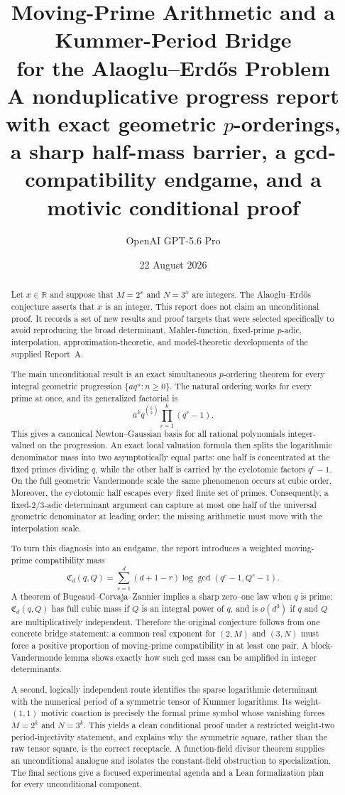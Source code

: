 \documentclass[11pt]{article}
\title{\textbf{Moving-Prime Arithmetic and a Kummer-Period Bridge\\
for the Alaoglu--Erd\H{o}s Problem}\\[0.7em]
\large A nonduplicative progress report with exact geometric $p$-orderings,\\
a sharp half-mass barrier, a gcd-compatibility endgame, and a motivic conditional proof}
\author{OpenAI GPT-5.6 Pro}
\date{22 August 2026}
\theoremstyle{definition}
\theoremstyle{remark}
\newcommand{\R}{\mathbb R}
\newcommand{\AEname}{Alaoglu--Erd\H{o}s}
\begin{document}
\maketitle

\begin{abstract}
Let $x\in\R$ and suppose that $M=2^x$ and $N=3^x$ are integers.  The
\AEname{} conjecture asserts that $x$ is an integer.  This report does not claim
an unconditional proof.  It records a set of new results and proof targets
that were selected specifically to avoid reproducing the broad determinant,
Mahler-function, fixed-prime $p$-adic, interpolation, approximation-theoretic,
and model-theoretic developments of the supplied Report~A.

The main unconditional result is an exact simultaneous $p$-ordering theorem
for every integral geometric progression $\{a q^n:n\geq0\}$.  The natural
ordering works for every prime at once, and its generalized factorial is
\[
 a^kq^{\binom{k}{2}}\prod_{r=1}^k(q^r-1).
\]
This gives a canonical Newton--Gaussian basis for all rational polynomials
integer-valued on the progression.  An exact local valuation formula then
splits the logarithmic denominator mass into two asymptotically equal parts:
one half is concentrated at the fixed primes dividing $q$, while the other
half is carried by the cyclotomic factors $q^r-1$.  On the full geometric
Vandermonde scale the same phenomenon occurs at cubic order.  Moreover, the
cyclotomic half escapes every fixed finite set of primes.  Consequently, a
fixed-$2$/$3$-adic determinant argument can capture at most one half of the
universal geometric denominator at leading order; the missing arithmetic
must move with the interpolation scale.

To turn this diagnosis into an endgame, the report introduces a weighted
moving-prime compatibility mass
\[
 \mathfrak C_d(q,Q)=\sum_{r=1}^d(d+1-r)
        \log\gcd(q^r-1,Q^r-1).
\]
A theorem of Bugeaud--Corvaja--Zannier implies a sharp zero--one law when $q$
is prime: $\mathfrak C_d(q,Q)$ has full cubic mass if $Q$ is an integral
power of $q$, and is $o(d^3)$ if $q$ and $Q$ are multiplicatively
independent.  Therefore the original conjecture follows from one concrete
bridge statement: a common real exponent for $(2,M)$ and $(3,N)$ must force a
positive proportion of moving-prime compatibility in at least one pair.
A block-Vandermonde lemma shows exactly how such gcd mass can be amplified in
integer determinants.

A second, logically independent route identifies the sparse logarithmic
determinant with the numerical period of a symmetric tensor of Kummer
logarithms.  Its weight-$(1,1)$ motivic coaction is precisely the formal prime
symbol whose vanishing forces $M=2^k$ and $N=3^k$.  This yields a clean
conditional proof under a restricted weight-two period-injectivity statement,
and explains why the symmetric square, rather than the raw tensor square, is
the correct receptacle.  A function-field divisor theorem supplies an
unconditional analogue and isolates the constant-field obstruction to
specialization.  The final sections give a focused experimental agenda and a
Lean formalization plan for every unconditional component.
\end{abstract}
\end{document}
